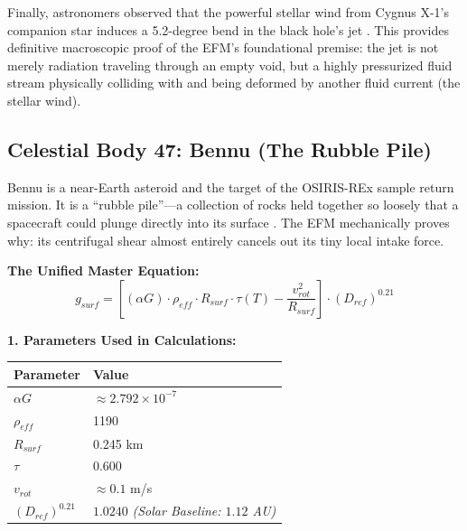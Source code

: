 \documentclass[11pt, a4paper]{article}
\begin{document}
  Finally, astronomers observed that the powerful stellar wind from Cygnus X-1's companion star induces a 5.2-degree bend in the black hole's jet \cite{prabu2026}. This provides definitive macroscopic proof of the EFM's foundational premise: the jet is not merely radiation traveling through an empty void, but a highly pressurized fluid stream physically colliding with and being deformed by another fluid current (the stellar wind).

\clearpage
\subsection{Celestial Body 47: Bennu (The Rubble Pile)}
  Bennu is a near-Earth asteroid and the target of the OSIRIS-REx sample return mission. It is a ``rubble pile''---a collection of rocks held together so loosely that a spacecraft could plunge directly into its surface \cite{walsh2022}. The EFM mechanically proves why: its centrifugal shear almost entirely cancels out its tiny local intake force.

  \vspace{0.5em}
  \noindent \textbf{The Unified Master Equation:}
  $$ g_{surf} = \left[ (\alpha G) \cdot \rho_{eff} \cdot R_{surf} \cdot \tau(T) - \frac{v_{rot}^2}{R_{surf}} \right] \cdot (D_{ref})^{0.21} $$

  \vspace{0.5em}
  \noindent \textbf{1. Parameters Used in Calculations:} \\[0.5em]
  \begingroup
  \renewcommand{\arraystretch}{1.3}
  \hspace*{2em}
  \begin{tabular}{|l|l|}
    \hline
    \textbf{Parameter} & \textbf{Value} \\ \hline
    $\alpha G$ & $\approx 2.792 \times 10^{-7}$ \\ \hline
    $\rho_{eff}$ & 1190 \\ \hline
    $R_{surf}$ & 0.245 km \\ \hline
    $\tau$ & 0.600 \\ \hline
    $v_{rot}$ & $\approx 0.1$ m/s \\ \hline
    $(D_{ref})^{0.21}$ & $1.0240$ \textit{(Solar Baseline: $1.12$ AU)} \\ \hline
  \end{tabular}
  \endgroup
\end{document}
